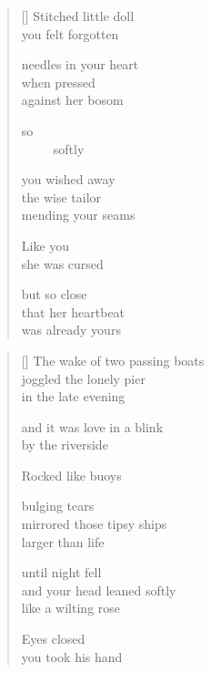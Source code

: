 \documentclass[12pt,a4paper]{article}
\begin{document}
\newpage

\poemtitle{}

\settowidth{\versewidth}{needles in your heart}

\bigskip

\begin{verse}[\versewidth]
  Stitched little doll \\
  you felt forgotten

  needles in your heart \\
  when pressed \\
  against her bosom

  so \\
  \ \ \ \ \ softly

  you wished away \\
  the wise tailor \\
  mending your seams

  Like you \\
  she was cursed

  but so close \\
  that her heartbeat \\
  was already yours
\end{verse}


\newpage

\poemtitle{}

\settowidth{\versewidth}{The wake of two passing boats}

\bigskip

\begin{verse}[\versewidth]
  The wake of two passing boats \\
  joggled the lonely pier \\
  in the late evening

  and it was love in a blink \\
  by the riverside

  Rocked like buoys

  bulging tears \\
  mirrored those tipsy ships \\
  larger than life

  until night fell \\
  and your head leaned softly \\
  like a wilting rose

  Eyes closed \\
  you took his hand
\end{verse}
\end{document}
